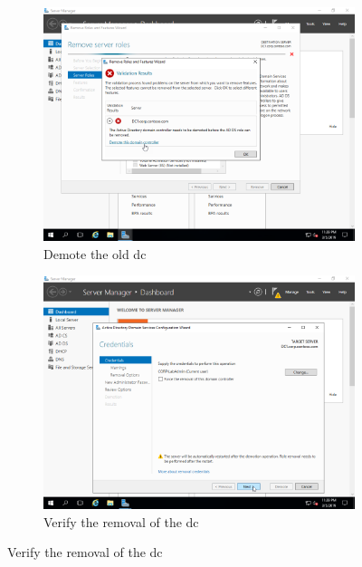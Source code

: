 \begin{figure}[!htb]\ContinuedFloat
	\begin{subfigure}{0.5\textwidth}
		\captionsetup{width=0.8\linewidth}
		\includegraphics[width=0.9\linewidth]{img/Methodologie/Migration31.png}
		\centering
		\caption{Demote the old \acrshort{dc}}
	\end{subfigure}
	\begin{subfigure}{0.5\textwidth}
		\captionsetup{width=0.8\linewidth}
		\includegraphics[width=0.9\linewidth]{img/Methodologie/Migration32.png} 
		\centering
		\caption{Verify the removal of the \acrshort{dc}}
	\end{subfigure}
\end{figure}
